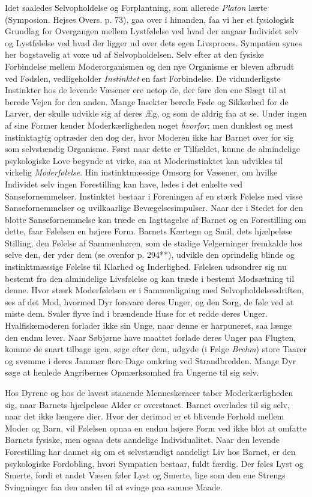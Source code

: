 \documentclass[12pt,a4paper,openany]{book}
\newcommand{\opage}[1]{\marginnote{\footnotesize\textit{[#1]}}}
\begin{document}
\opage{298}Idet saaledes Selvopholdelse og Forplantning, som allerede
\emph{Platon} lærte (Symposion. Hejses Overs. p. 73), gaa over i
hinanden, faa vi her et fysiologisk Grundlag for Overgangen mellem
Lystfølelse ved hvad der angaar Individet selv og Lystfølelse ved hvad
der ligger ud over dets egen Livsproces. Sympatien synes her bogstavelig
at voxe ud af Selvopholdelsen. Selv efter at den fysiske Forbindelse
mellem Moderorganismen og den nye Organisme er bleven afbrudt ved
Fødslen, vedligeholder \emph{Instinktet} en fast Forbindelse. De
vidunderligste Instinkter hos de levende Væsener ere netop de, der føre
den ene Slægt til at berede Vejen for den anden. Mange Insekter berede
Føde og Sikkerhed for de Larver, der skulle udvikle sig af deres Æg, og
som de aldrig faa at se. Under ingen af sine Former kender
Moderkærligheden noget \emph{hvorfor}; men dunklest og mest
instinktagtig optræder den dog der, hvor Moderen ikke har Barnet over
for sig som selvstændig Organisme. Først naar dette er Tilfældet, kunne
de almindelige psykologiske Love begynde at virke, saa at
Moderinstinktet kan udvikles til virkelig \emph{Moderfølelse}. Hin
instinktmæssige Omsorg for Væsener, om hvilke Individet selv ingen
Forestilling kan have, ledes i det enkelte ved Sansefornemmelser.
Instinktet bestaar i Foreningen af en stærk Følelse med visse
Sansefornemmelser og uvilkaarlige Bevægelsesimpulser. Naar der i Stedet
for den blotte Sansefornemmelse kan træde en Iagttagelse af Barnet og en
Forestilling om dette, faar Følelsen en højere Form. Barnets Kærtegn og
Smil, dets hjælpeløse Stilling, den Følelse af Sammenhøren, som de
stadige Velgerninger fremkalde hos selve den, der yder dem (se ovenfor
p. 294**), udvikle den oprindelig blinde og instinktmæssige Følelse til
Klarhed og Inderlighed. Følelsen udsondrer sig nu bestemt fra den
almindelige Livsfølelse og kan træde i bestemt Modsætning til denne.
Hvor stærk Moderfølelsen er i Sammenligning med Selvopholdelsesdriften,
ses af det Mod, hvormed Dyr forsvare deres Unger, og den Sorg, de føle
ved at miste dem. Svaler flyve ind i brændende Huse for et redde deres
Unger. Hvalfiskemoderen forlader ikke sin Unge, naar denne er
harpuneret, saa længe den endnu lever. Naar Søbjørne have maattet
forlade deres Unger paa Flugten, komme de snart tilbage igen, søge efter
dem, udgyde (i Følge
\opage{299}\emph{Brehm}) store Taarer og svømme i deres Jammer flere
Dage omkring ved Strandbredden. Mange Dyr søge at henlede Angribernes
Opmærksomhed fra Ungerne til sig selv.

Hos Dyrene og hos de lavest staaende Menneskeracer taber
Moderkærligheden sig, naar Barnets hjælpeløse Alder er overstaaet.
Barnet overlades til sig selv, naar det ikke længere dier. Hvor der
derimod er et blivende Forhold mellem Moder og Barn, vil Følelsen opnaa
en endnu højere Form ved ikke blot at omfatte Barnets fysiske, men ogsaa
dets aandelige Individualitet. Naar den levende Forestilling har dannet
sig om et selvstændigt aandeligt Liv hos Barnet, er den psykologiske
Fordobling, hvori Sympatien bestaar, fuldt færdig. Der føles Lyst og
Smerte, fordi et andet Væsen føler Lyst og Smerte, lige som den ene
Strengs Svingninger faa den anden til at svinge paa samme Maade.
\end{document}
